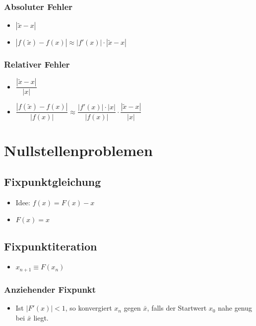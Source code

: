 \documentclass[6pt,a4paper]{scrartcl}
\begin{document}
\begin{multicols*}{4}
\begin{itemize}
				\end{itemize}		
		
    			\subsubsection{Absoluter Fehler}
    				\begin{itemize}\itemsep0pt			
    					\item $|\tilde{x} - x|$	
					\item $|f(\tilde{x})-f(x)|\approx |f'(x)|\cdot |\tilde{x} - x|$
				\end{itemize}
			\subsubsection{Relativer Fehler}	
				\begin{itemize}\itemsep0pt	
					\item $\dfrac{|\tilde{x} - x|}{|x|}$
					\item $\dfrac{|f(\tilde{x})-f(x)|}{|f(x)|}\approx \dfrac{|f'(x)|\cdot |x|}{|f(x)|} \cdot \dfrac{|\tilde{x} - x|}{|x|}$
				\end{itemize}
   
	\section{Nullstellenproblemen}
		\subsection{Fixpunktgleichung}
			\begin{itemize}\itemsep0pt	
				\item Idee: $f(x) = F(x) - x$
				\item $F(x) = x$
			\end{itemize}
		\subsection{Fixpunktiteration}
			\begin{itemize}\itemsep0pt	
				\item $x_{n+1} \equiv F(x_{n})$
			\end{itemize}
			\subsubsection{Anziehender Fixpunkt}
				\begin{itemize}\itemsep0pt	
					\item Ist $|F'(x)| < 1$, so konvergiert $x_{n}$ gegen $\bar{x}$, falls der Startwert $x_{0}$ nahe genug bei $\bar{x}$ liegt.
				\end{itemize}

\end{multicols*}
\end{document}
